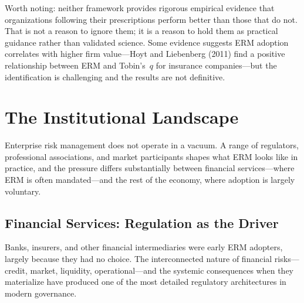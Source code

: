 \documentclass[11pt,openany]{book}
\begin{document}
Worth noting: neither framework provides rigorous empirical evidence that organizations following their prescriptions perform better than those that do not. That is not a reason to ignore them; it is a reason to hold them as practical guidance rather than validated science. Some evidence suggests ERM adoption correlates with higher firm value---Hoyt and Liebenberg (2011) find a positive relationship between ERM and Tobin's~$q$ for insurance companies---but the identification is challenging and the results are not definitive.


\section{The Institutional Landscape}
\label{sec:institutional-landscape}

Enterprise risk management does not operate in a vacuum. A range of regulators, professional associations, and market participants shapes what ERM looks like in practice, and the pressure differs substantially between financial services---where ERM is often mandated---and the rest of the economy, where adoption is largely voluntary.

\subsection{Financial Services: Regulation as the Driver}
\label{subsec:financial-services}

Banks, insurers, and other financial intermediaries were early ERM adopters, largely because they had no choice. The interconnected nature of financial risks---credit, market, liquidity, operational---and the systemic consequences when they materialize have produced one of the most detailed regulatory architectures in modern governance.
\end{document}
